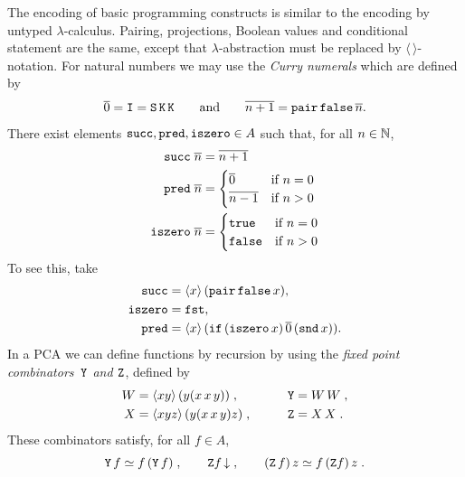 The encoding of basic programming constructs is similar to the
encoding by untyped $\lambda$-calculus.
%
%
%
%
\label{sym:combPair}%
\label{sym:combFst}%
\label{sym:combSnd}%
%
Pairing, projections, Boolean values and conditional statement are the
same, except that $\lambda$-abstraction must be replaced by
$\langle\,\rangle$-notation. For natural numbers we may use the
%
%
%
\label{sym:curry_numeral}%
%
\emph{Curry numerals} which are defined by 
%
\begin{equation*}
  \overline{0} = \mathtt{I} = \mathtt{S}\, \mathtt{K}\, \mathtt{K}
  \qquad\text{and}\qquad
  \overline{n+1} = \mathtt{pair} \, \mathtt{false} \, \overline{n}.
\end{equation*}
%
There exist elements
%
%
%
%
%
$\mathtt{succ}, \mathtt{pred}, \mathtt{iszero} \in A$ such that,
for all $n \in \mathbb{N}$,
%
\label{sym:succ}%
\label{sym:pred}%
\label{sym:iszero}%
%
\begin{align*}
  \mathtt{succ}\; \overline{n} &= \overline{n+1} \\
  \mathtt{pred}\; \overline{n} &= 
  \begin{cases}
    \overline{0} & \text{if $n = 0$} \\
    \overline{n-1} & \text{if $n > 0$}
  \end{cases}\\
  \mathtt{iszero}\; \overline{n} &=
  \begin{cases}
    \mathtt{true} & \text{if $n = 0$} \\
    \mathtt{false} & \text{if $n > 0$}
  \end{cases}
\end{align*}
%
To see this, take
%
\begin{align*}
  \mathtt{succ} &= \langle x \rangle\,(\mathtt{pair} \, \mathtt{false} \,x),\\ 
  \mathtt{iszero} &= \mathtt{fst},\\
  \mathtt{pred} &=
  \langle x \rangle\,(\mathtt{if}\, (\mathtt{iszero}\, x)\, \overline{0}\, (\mathtt{snd}\, x)).
\end{align*}
%
In a PCA we can define functions by recursion by using the
%
%
%
%
%
\label{sym:combY}%
\label{sym:combZ}%
\label{sym:combW}%
%
\emph{fixed point combinators~$\mathtt{Y}$ and $\mathtt{Z}$}, defined by
%
\begin{alignat*}{2}
  W &= \langle x y \rangle\,(y(x\, x\, y))\;, &
  \qquad
  \mathtt{Y} &= W\, W \;, \\
  X &= \langle x y z \rangle\,(y (x\, x\, y) z) \;, &
  \qquad
  \mathtt{Z} &= X\, X \;.
\end{alignat*}
%
These combinators satisfy, for all $f \in A$,
%
\begin{equation*}
  \mathtt{Y}\, f \simeq f\, (\mathtt{Y}\, f) \;,
  \qquad
  \mathtt{Z} f\,{\downarrow} \;,
  \qquad
  (\mathtt{Z}\, f)\, z \simeq f\, (\mathtt{Z} f)\, z \;.
\end{equation*}

